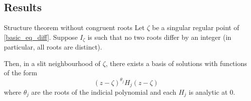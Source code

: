 \documentclass[../main.tex]{subfiles}
\begin{document}
%
%	
%	
%	
%	
%	
%	
%	

\subsection{Results}

\begin{thm}{Structure theorem without congruent roots}
	Let $\zeta$ be a singular regular point of \ref{basic_eq_diff}. Suppose $I_\zeta$ is such that no two roots differ by an integer (in particular, all roots are distinct).
	
	Then, in a slit neighbourhood of $\zeta$, there exists a basis of solutions with functions of the form
	\begin{equation}
	{(z - \zeta)}^{\theta_j} H_j (z - \zeta)
	\end{equation}
	where $\theta_j$ are the roots of the indicial polynomial and each $H_j$ is analytic at 0.
\end{thm}
\end{document}

